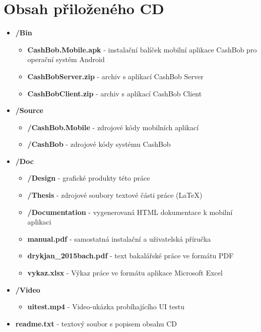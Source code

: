 \chapter{Obsah přiloženého CD}
\label{ch:cdcontents}

\begin{itemize}
\item \textbf{/Bin}
    \begin{itemize}
    \item \textbf{CashBob.Mobile.apk} - instalační balíček mobilní aplikace CashBob pro operační systém Android
    \item \textbf{CashBobServer.zip} - archiv s aplikací CashBob Server
    \item \textbf{CashBobClient.zip} - archiv s aplikací CashBob Client
    \end{itemize}
    
\item \textbf{/Source}
    \begin{itemize}
    \item \textbf{/CashBob.Mobile} - zdrojové kódy mobilních aplikací
    \item \textbf{/CashBob} - zdrojové kódy systému CashBob
    \end{itemize}
\item \textbf{/Doc}
    \begin{itemize}
    \item \textbf{/Design} - grafické produkty této práce
    \item \textbf{/Thesis} - zdrojové soubory textové části práce (\LaTeX)
    \item \textbf{/Documentation} - vygenerovaná HTML dokumentace k mobilní aplikaci
    \item \textbf{manual.pdf} - samostatná instalační a uživatelská příručka
    \item \textbf{drykjan\_2015bach.pdf} - text bakalářské práce ve formátu PDF
    \item \textbf{vykaz.xlsx} - Výkaz práce ve formátu aplikace  Microsoft Excel
    \end{itemize}

\item \textbf{/Video}
    \begin{itemize}
    \item \textbf{uitest.mp4} - Video-ukázka probíhajícího UI testu
    \end{itemize}
\item \textbf{readme.txt} - textový soubor s popisem obsahu CD
\end{itemize}